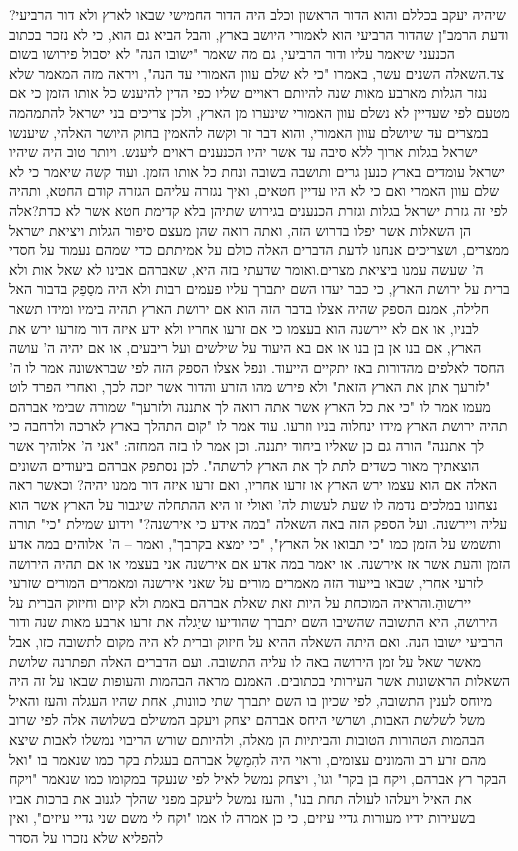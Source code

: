 \documentclass[12pt, openany]{book}
\begin{document}
שיהיה יעקב בכללם והוא הדור הראשון וכלב היה הדור החמישי שבאו לארץ ולא דור הרביעי? ודעת הרמב"ן שהדור הרביעי הוא לאמורי היושב בארץ, והבל הביא גם הוא, כי לא נזכר בכתוב הכנעני שיאמר עליו ודור הרביעי, גם מה שאמר "ישובו הנה" לא יסבול פירושו בשום צד.השאלה השנים עשר, באמרו "כי לא שלם עוון האמורי עד הנה", ויראה מזה המאמר שלא נגזר הגלות מארבע מאות שנה להיותם ראויים שליו כפי הדין להיענש כל אותו הזמן כי אם מטעם לפי שעדיין לא נשלם עוון האמורי שינערו מן הארץ, ולכן צריכים בני ישראל להתמהמה במצרים עד שיושלם עוון האמורי, והוא דבר זר וקשה להאמין בחוק היושר האלהי, שיענשו ישראל בגלות ארוך ללא סיבה עד אשר יהיו הכנענים ראוים ליענש. ויותר טוב היה שיהיו ישראל עומדים בארץ כנען גרים ותושבה בשובה ונחת כל אותו הזמן. ועוד קשה שיאמר כי לא שלם עוון האמרי ואם כי לא היו עדיין חטאים, ואיך נגזרה עליהם הגזרה קודם החטא, ותהיה לפי זה גזרת ישראל בגלות וגזרת הכנענים בגירוש שתיהן בלא קדימת חטא אשר לא כדת?אלה הן השאלות אשר יפלו בדרוש הזה, ואתה רואה שהן מעצם סיפור הגלות ויציאת ישראל ממצרים, ושצריכים אנחנו לדעת הדברים האלה כולם על אמיתתם כדי שמהם נעמוד על חסדי ה' שעשה עמנו ביציאת מצרים.ואומר שדעתי בזה היא, שאברהם אבינו לא שאל אות ולא ברית על ירושת הארץ, כי כבר יעדו השם יתברך עליו פעמים רבות ולא היה מסַפֵק בדבור האל חלילה, אמנם הספק שהיה אצלו בדבר הזה הוא אם ירושת הארץ תהיה בימיו ומידו תשאר לבניו, או אם לא יירשנה הוא בעצמו כי אם זרעו אחריו ולא ידע איזה דור מזרעו ירש את הארץ, אם בנו אן בן בנו או אם בא היעוד על שילשים ועל ריבעים, או אם יהיה ה' עושה החסד לאלפים מהדורות באז יתקיים הייעוד. ונפל אצלו הספק הזה לפי שבראשונה אמר לו ה' "לזרעך אתן את הארץ הזאת" ולא פירש מהו הזרע והדור אשר יזכה לכך, ואחרי הפרד לוט מעמו אמר לו "כי את כל הארץ אשר אתה רואה לך אתננה ולזרעך" שמורה שבימי אברהם תהיה ירושת הארץ מידו ינחלוה בניו וזרעו. עוד אמר לו "קום התהלך בארץ לארכה ולרחבה כי לך אתננה" הורה גם כן שאליו ביחוד יתננה. וכן אמר לו בזה המחזה: "אני ה' אלוהיך אשר הוצאתיך מאור כשדים לתת לך את הארץ לרשתה". לכן נסתפק אברהם ביעודים השונים האלה אם הוא עצמו ירש הארץ או זרעו אחריו, ואם זרעו איזה דור ממנו יהיה? וכאשר ראה נצחונו במלכים נדמה לו שעת לעשות לה' ואולי זו היא ההתחלה שיגבור על הארץ אשר הוא עליה ויירשנה. ועל הספק הזה באה השאלה "במה אידע כי אירשנה?" וידוע שמילת "כי" תורה ותשמש על הזמן כמו "כי תבואו אל הארץ", "כי ימצא בקרבך", ואמר – ה' אלוהים במה אדע הזמן והעת אשר אז אירשנה. או יאמר במה אדע אם אירשנה אני בעצמי או אם תהיה הירושה לזרעי אחרי, שבאו בייעוד הזה מאמרים מורים על שאני אירשנה ומאמרים המורים שזרעי יירשוהַ.והראיה המוכחת על היות זאת שאלת אברהם באמת ולא קיום וחיזוק הברית על הירושה, היא התשובה שהשיבו השם יתברך שהודיעו שיַגלה את זרעו ארבע מאות שנה ודור הרביעי ישובו הנה. ואם היתה השאלה ההיא על חיזוק וברית לא היה מקום לתשובה כזו, אבל מאשר שאל על זמן הירושה באה לו עליה התשובה. ועם הדברים האלה תפתרנה שלושת השאלות הראשונות אשר העירותי בכתובים. האמנם מראה הבהמות והעופות שבאו על זה היה מיוחס לענין התשובה, לפי שכיון בו השם יתברך שתי כוונות, אחת שהיו העגלה והעז והאיל משל לשלשת האבות, ושרשי היחס אברהם יצחק ויעקב המשילם בשלושה אלה לפי שרוב הבהמות הטהורות הטובות והביתיות הן מאלה, ולהיותם שורש הריבוי נמשלו לאבות שיצא מהם זרע רב והמונים עצומים, וראוי היה להִמַשֵל אברהם בעגלת בקר כמו שנאמר בו "ואל הבקר רץ אברהם, ויקח בן בקר" וגו', ויצחק נמשל לאיל לפי שנעקד במקומו כמו שנאמר "ויקח את האיל ויעלהו לעולה תחת בנו", והעז נמשל ליעקב מפני שהלך לגנוב את ברכות אביו בשעירות ידיו מעורות גדיי עיזים, כי כן אמרה לו אמו "וקח לי משם שני גדיי עיזים", ואין להפליא שלא נזכרו על הסדר 
\end{document}
